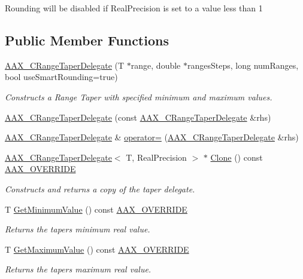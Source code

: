 Rounding will be disabled if Real\+Precision is set to a value less than 1 \subsection*{Public Member Functions}
\begin{DoxyCompactItemize}
\item 
\mbox{\hyperlink{a01557_a06236d6426f76ff4f7a1d51e9dec5b8c}{A\+A\+X\+\_\+\+C\+Range\+Taper\+Delegate}} (T $\ast$range, double $\ast$ranges\+Steps, long num\+Ranges, bool use\+Smart\+Rounding=true)
\begin{DoxyCompactList}\small\item\em Constructs a Range Taper with specified minimum and maximum values. \end{DoxyCompactList}\item 
\mbox{\hyperlink{a01557_a4c2f8d8cad37e465c16008628d8a9282}{A\+A\+X\+\_\+\+C\+Range\+Taper\+Delegate}} (const \mbox{\hyperlink{a01557}{A\+A\+X\+\_\+\+C\+Range\+Taper\+Delegate}} \&rhs)
\item 
\mbox{\hyperlink{a01557}{A\+A\+X\+\_\+\+C\+Range\+Taper\+Delegate}} \& \mbox{\hyperlink{a01557_abb6a95a43a8614a1c83fc84208d2e8f1}{operator=}} (\mbox{\hyperlink{a01557}{A\+A\+X\+\_\+\+C\+Range\+Taper\+Delegate}} \&rhs)
\item 
\mbox{\hyperlink{a01557}{A\+A\+X\+\_\+\+C\+Range\+Taper\+Delegate}}$<$ T, Real\+Precision $>$ $\ast$ \mbox{\hyperlink{a01557_a787f7649ff4b94af1642bfa0198007a2}{Clone}} () const \mbox{\hyperlink{a00392_ac2f24a5172689ae684344abdcce55463}{A\+A\+X\+\_\+\+O\+V\+E\+R\+R\+I\+DE}}
\begin{DoxyCompactList}\small\item\em Constructs and returns a copy of the taper delegate. \end{DoxyCompactList}\item 
T \mbox{\hyperlink{a01557_a94f30f1ae6f4be57d2fe44928fb4a467}{Get\+Minimum\+Value}} () const \mbox{\hyperlink{a00392_ac2f24a5172689ae684344abdcce55463}{A\+A\+X\+\_\+\+O\+V\+E\+R\+R\+I\+DE}}
\begin{DoxyCompactList}\small\item\em Returns the taper\textquotesingle{}s minimum real value. \end{DoxyCompactList}\item 
T \mbox{\hyperlink{a01557_a37653711483325931180ed54234b63ec}{Get\+Maximum\+Value}} () const \mbox{\hyperlink{a00392_ac2f24a5172689ae684344abdcce55463}{A\+A\+X\+\_\+\+O\+V\+E\+R\+R\+I\+DE}}
\begin{DoxyCompactList}\small\item\em Returns the taper\textquotesingle{}s maximum real value. \end{DoxyCompactList}\item 

\end{DoxyCompactItemize}
